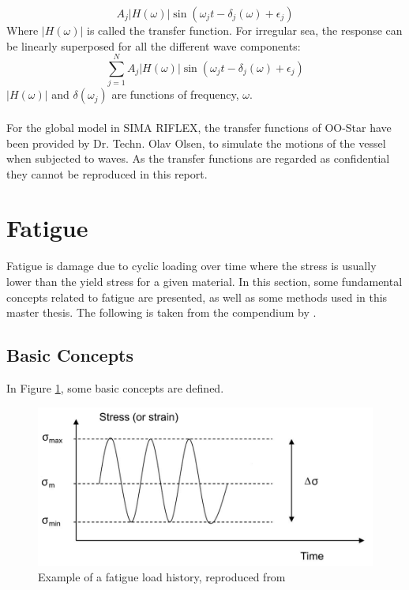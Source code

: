 \begin{equation}
    A_j |H(\omega)|\sin(\omega_jt-\delta_j(\omega)+\epsilon_j)
\end{equation}
Where $|H(\omega)|$ is called the transfer function. For irregular sea, the response can be linearly superposed for all the different wave components:
\begin{equation}
    \sum_{j=1}^N  A_j |H(\omega)|\sin(\omega_jt-\delta_j(\omega)+\epsilon_j)
\end{equation}
 $|H(\omega)|$ and $\delta(\omega_j)$ are functions of frequency, $\omega$.\\\\
For the global model in SIMA RIFLEX, the transfer functions of OO-Star have been provided by Dr. Techn. Olav Olsen, to simulate the motions of the vessel when subjected to waves. As the transfer functions are regarded as confidential they cannot be reproduced in this report.   

\section{Fatigue}
Fatigue is damage due to cyclic loading over time where the stress is usually lower than the yield stress for a given material. In this section, some fundamental concepts related to fatigue are presented, as well as some methods used in this master thesis. The following is taken from the compendium by \cite{fatigue2016}. 
\subsection{Basic Concepts}
In Figure \ref{fig:fatigue}, some basic concepts are defined. 

\begin{figure}[h!]
\centering
\includegraphics[scale=0.6]{figures/cycle}
\caption[$\; \:$Example of a fatigue load history]{Example of a fatigue load history, reproduced from  \cite{fatigue2016} }
 \label{fig:fatigue}
\end{figure}

